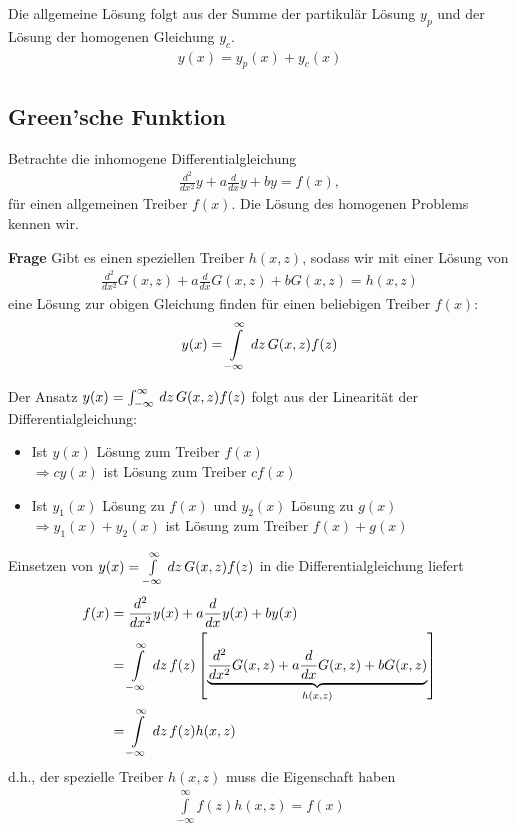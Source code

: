 \begin{Bemerkung}
 Die allgemeine Lösung folgt aus der Summe der partikulär Lösung $y_p$ und der
 Lösung der homogenen Gleichung $y_c$.
\begin{align}
 y(x) = y_p(x) + y_c(x)
\end{align}
\end{Bemerkung}

\subsection{Green'sche Funktion}
Betrachte die inhomogene Differentialgleichung
\begin{align}
\frac{d^2}{dx^2}y + a\frac{d}{dx}y + by = f(x),
\end{align}
für einen allgemeinen Treiber $f(x)$. Die Lösung des homogenen Problems kennen
wir.

\par{\bf Frage} Gibt es einen speziellen Treiber $h(x,z)$, sodass wir mit einer
Lösung von
\begin{align}
\frac{d^2}{dx^2}G(x,z) + a\frac{d}{dx}G(x,z) + bG(x,z) = h(x,z)
\end{align}
eine Lösung zur obigen Gleichung finden für einen beliebigen Treiber $f(x)$:
\begin{align}
y(x) = \int \limits_{-\infty}^{\infty} \,dz\, G(x,z)f(z)
\end{align}

\begin{Bemerkung}
Der Ansatz $y(x) = \int_{-\infty}^{\infty} \,dz\, G(x,z)f(z)$ folgt aus der
Linearität der Differentialgleichung:
\begin{itemize}
  \item Ist $y(x)$ Lösung zum Treiber $f(x)$\\
  $\Rightarrow cy(x)$ ist Lösung zum Treiber $cf(x)$
  \item Ist $y_1(x)$ Lösung zu $f(x)$ und $y_2(x)$ Lösung zu $g(x)$\\
  $\Rightarrow y_1(x)+ y_2(x)$ ist Lösung zum Treiber $f(x) + g(x)$
\end{itemize}
\end{Bemerkung}

Einsetzen von $y(x) = \int \limits_{-\infty}^{\infty}\,dz\, G(x,z)f(z)$ in die
Differentialgleichung liefert
\begin{align}
f(x) &= \frac{d^2}{dx^2}y(x) + a\frac{d}{dx}y(x) + by(x) \\
&= \int
\limits_{-\infty}^{\infty}\,dz\, f(z)\left[
\underbrace{\frac{d^2}{dx^2}G(x,z)+
a\frac{d}{dx}G(x,z) + bG(x,z)}_{h(x,z)} \right]\\
&= \int \limits_{-\infty}^{\infty} \,dz\, f(z) h(x,z)
\end{align}
d.h., der spezielle Treiber $h(x,z)$ muss die Eigenschaft haben
\begin{align}
\int \limits_{-\infty}^{\infty}f(z)h(x,z) = f(x)
\end{align}

